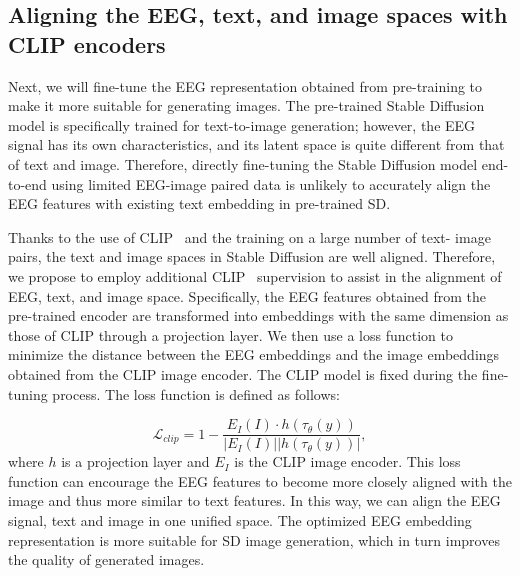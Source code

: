 \documentclass[10pt,twocolumn,letterpaper]{article}
\begin{document}
\subsection{Aligning the EEG, text, and image spaces with CLIP encoders}
Next, we will fine-tune the EEG representation obtained from pre-training to make it more suitable for generating images. 
The pre-trained Stable Diffusion model is specifically trained for text-to-image generation; however, the EEG signal has its own characteristics, and its latent space is quite different from that of text and image.
Therefore, directly fine-tuning the Stable Diffusion model end-to-end using limited EEG-image paired data is unlikely to accurately align the EEG features with existing text embedding in pre-trained SD.

Thanks to the use of CLIP~\cite{radford2021learning} and the training on a large number of text-
image pairs, the text and image spaces in Stable Diffusion
are well aligned. 
Therefore, we propose to employ additional CLIP~\cite{radford2021learning} supervision to assist in the alignment of EEG, text, and image space.
Specifically, the EEG features obtained from the pre-trained encoder are transformed into embeddings with the same dimension as those of CLIP through a projection layer. We then use a loss function to minimize the distance between the EEG embeddings and the image embeddings obtained from the CLIP image encoder.
The CLIP model is fixed during the fine-tuning process.
The loss function is defined as follows:

\begin{equation}
    \mathcal{L}_{clip} = 1 - \frac{E_I(I)\cdot h(\tau_\theta(y))}{|E_I(I)||h(\tau_\theta(y))|},
\end{equation}
where $h$ is a projection layer and $E_I$ is the CLIP image encoder. This loss function can encourage the EEG features to become more closely aligned with the image and thus more similar to text features.
In this way, we can align the EEG signal, text and image in one unified space. 
The optimized EEG embedding representation is more suitable for SD image
generation, which in turn improves the quality of generated
images.
\end{document}
